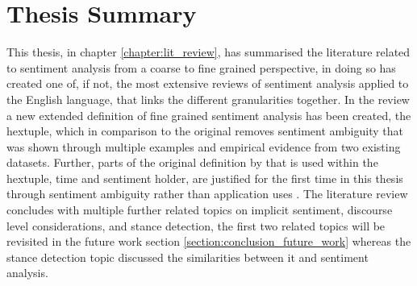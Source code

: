 \section{Thesis Summary}
This thesis, in chapter \ref{chapter:lit_review}, has summarised the literature related to sentiment analysis from a coarse to fine grained perspective, in doing so has created one of, if not, the most extensive reviews of sentiment analysis applied to the English language, that links the different granularities together. In the review a new extended definition of fine grained sentiment analysis has been created, the hextuple, which in comparison to the original \citep{liu2015sentiment} removes sentiment ambiguity that was shown through multiple examples and empirical evidence from two existing datasets. Further, parts of the original definition by \citet{liu2015sentiment} that is used within the hextuple, time and sentiment holder, are justified for the first time in this thesis through sentiment ambiguity rather than application uses \citep{liu2015sentiment}. The literature review concludes with multiple further related topics on implicit sentiment, discourse level considerations, and stance detection, the first two related topics will be revisited in the future work section \ref{section:conclusion_future_work} whereas the stance detection topic discussed the similarities between it and sentiment analysis.

